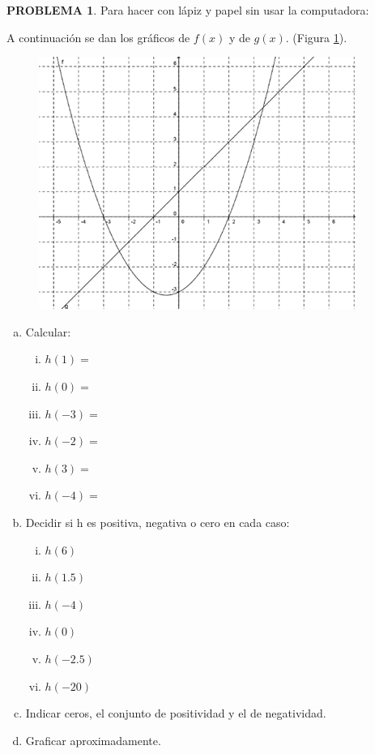 \documentclass[oneside,spanish]{amsart}
\numberwithin{equation}{section}
\numberwithin{figure}{section}
\theoremstyle{definition}
\newtheorem{problema}{\normalfont PROBLEMA}
\begin{document}
\begin{problema}\label{prob:8}
Para hacer con lápiz y papel sin usar la computadora:

A continuación se dan los gráficos de $f(x)$ y de $g(x)$. (Figura \ref{fig:imagen4}).

\begin{figure}[h]
	\centering
	\caption{}
	\label{fig:imagen4}
	\includegraphics[width=0.6\linewidth]{Anexos-03/Imagen4}
\end{figure}

\begin{enumerate}[a.]
	\item Calcular:
	\begin{multicols}{3}
		\begin{enumerate}[i.]
		\item $h(1)=$
		\item $h(0)=$
		\item $h(-3)=$
		\item $h(-2)=$
		\item $h(3)=$
		\item $h(-4)=$
		\end{enumerate}
	\end{multicols}
	
	\item Decidir si h es positiva, negativa o cero en cada caso:
	\begin{multicols}{3}
		\begin{enumerate}[i.]
			\item $h(6)$
			\item $h(1.5)$
			\item $h(-4)$
			\item $h(0)$
			\item $h(-2.5)$
			\item $h(-20)$
		\end{enumerate}
	\end{multicols}
	
	\item Indicar ceros, el conjunto de positividad y el de negatividad.
	
	\item Graficar aproximadamente.
\end{enumerate}
\end{problema}
\end{document}
